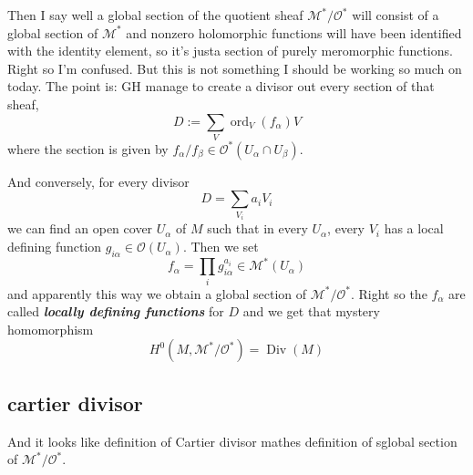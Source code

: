 Then I say well a global section of the quotient sheaf \(\mathcal{M}^*/\mathcal{O}^*\) will consist of a global section of \(\mathcal{M}^*\) and nonzero holomorphic functions will have been identified with the identity element, so it's justa  section of purely meromorphic functions. Right so I'm confused. But this is not something I should be working so much on today. The point is: GH manage to create a divisor out every section of that sheaf,
\[D:=\sum_V \operatorname{ord}_V(f_\alpha)V\]
where the section is given by  \(f_\alpha/f_\beta \in \mathcal{O}^*(U_\alpha \cap U_\beta)\).

And conversely, for every divisor
\[D=\sum_{V_i}a_iV_i\]
we can find an open cover \(U_\alpha\) of \(M\) such that in every \(U_\alpha\), every \(V_i\) has a local defining function \(g_{i\alpha}\in \mathcal{O}(U_\alpha)\). Then we set
\[f_\alpha=\prod_{i}g_{i\alpha}^{a_i}\in \mathcal{M}^*(U_\alpha)\]
and apparently this way we obtain a global section of \(\mathcal{M}^*/\mathcal{O}^*\). Right so the \(f_\alpha\) are called \textit{\textbf{locally defining functions}} for \(D\) and we get that mystery homomorphism
 \[H^{0}(M,\mathcal{M}^*/\mathcal{O}^*)=\operatorname{Div}(M)\]

\subsection{cartier divisor}

And it looks like \cite{har} definition of Cartier divisor mathes \cite{gri} definition of sglobal section of \(\mathcal{M}^*/\mathcal{O}^*\).

